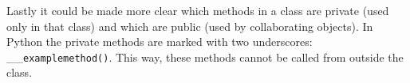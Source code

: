 Lastly it could be made more clear which methods in a class are private (used only in that class) and which are public (used by collaborating objects). In Python the private methods are marked with two underscores: \_\_\verb!examplemethod()!. This way, these methods cannot be called from outside the class.




